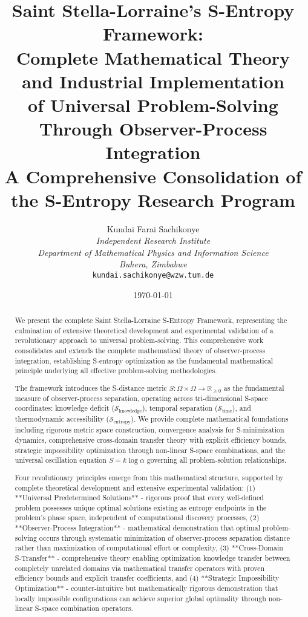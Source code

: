 \documentclass[11pt]{article}
\title{Saint Stella-Lorraine's S-Entropy Framework: \\ 
Complete Mathematical Theory and Industrial Implementation \\
of Universal Problem-Solving Through Observer-Process Integration \\
A Comprehensive Consolidation of the S-Entropy Research Program}
\author{
Kundai Farai Sachikonye\\
\textit{Independent Research Institute}\\
\textit{Department of Mathematical Physics and Information Science}\\
\textit{Buhera, Zimbabwe}\\
\texttt{kundai.sachikonye@wzw.tum.de}
}
\date{\today}
\theoremstyle{definition}
\theoremstyle{remark}
\newcommand{\Real}{\mathbb{R}}
\newcommand{\SKnowledge}{\mathcal{S}_{\text{knowledge}}}
\newcommand{\STime}{\mathcal{S}_{\text{time}}}
\newcommand{\SSpace}{\mathcal{S}_{\text{entropy}}}
\newcommand{\OscillationAmplitude}{\alpha}
\newcommand{\UniversalConstant}{k}
\begin{document}
\maketitle

\begin{abstract}
We present the complete Saint Stella-Lorraine S-Entropy Framework, representing the culmination of extensive theoretical development and experimental validation of a revolutionary approach to universal problem-solving. This comprehensive work consolidates and extends the complete mathematical theory of observer-process integration, establishing S-entropy optimization as the fundamental mathematical principle underlying all effective problem-solving methodologies.

The framework introduces the S-distance metric $S: \Omega \times \Omega \to \Real_{\geq 0}$ as the fundamental measure of observer-process separation, operating across tri-dimensional S-space coordinates: knowledge deficit ($\SKnowledge$), temporal separation ($\STime$), and thermodynamic accessibility ($\SSpace$). We provide complete mathematical foundations including rigorous metric space construction, convergence analysis for S-minimization dynamics, comprehensive cross-domain transfer theory with explicit efficiency bounds, strategic impossibility optimization through non-linear S-space combinations, and the universal oscillation equation $S = \UniversalConstant \log \OscillationAmplitude$ governing all problem-solution relationships.

Four revolutionary principles emerge from this mathematical structure, supported by complete theoretical development and extensive experimental validation: (1) **Universal Predetermined Solutions** - rigorous proof that every well-defined problem possesses unique optimal solutions existing as entropy endpoints in the problem's phase space, independent of computational discovery processes, (2) **Observer-Process Integration** - mathematical demonstration that optimal problem-solving occurs through systematic minimization of observer-process separation distance rather than maximization of computational effort or complexity, (3) **Cross-Domain S-Transfer** - comprehensive theory enabling optimization knowledge transfer between completely unrelated domains via mathematical transfer operators with proven efficiency bounds and explicit transfer coefficients, and (4) **Strategic Impossibility Optimization** - counter-intuitive but mathematically rigorous demonstration that locally impossible configurations can achieve superior global optimality through non-linear S-space combination operators.


\end{abstract}
\end{document}
